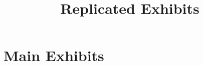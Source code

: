 \documentclass{article}
\title{Replicated Exhibits}
\begin{document}
\maketitle
\tableofcontents
{\footnotesize 
\listoffigures
\listoftables}
\clearpage

\section{Main Exhibits}

\end{document}

